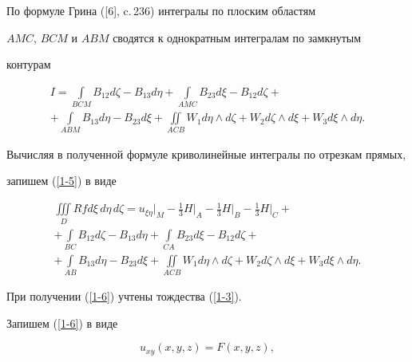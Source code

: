 По формуле Грина ([6], c.\,236) интегралы по плоским областям


$AMC$, $BCM$ и $ABM$ сводятся к однократным интегралам по замкнутым


контурам


\begin{gather*}


I=\int\limits_{BCM} B_{12} d\zeta - B_{13} d\eta


+\int\limits_{AMC} B_{23} d\xi - B_{12} d\zeta +\\


%


+\int\limits_{ABM} B_{13} d\eta - B_{23} d\xi


+\iint\limits_{ACB}  W_1 d\eta\wedge d\zeta


+W_2 d\zeta \wedge d\xi + W_3 d\xi \wedge d\eta.


\end{gather*}


Вычисляя в полученной формуле криволинейные интегралы по отрезкам прямых,


запишем (\ref{1-5}) в виде


\begin{multline}\label{1-6}   %


\iiint\limits_{D} Rf d\xi\, d\eta\, d\zeta=


u_{\xi\eta}\big\vert_{M}-\frac{1}{3}H\big\vert_{A}


-\frac{1}{3}H\big\vert_{B}


-\frac{1}{3}H\big\vert_{C}+\\


+\int\limits_{BC} B_{12} d\zeta - B_{13} d\eta


+\int\limits_{CA} B_{23} d\xi - B_{12} d\zeta +\\


+\int\limits_{AB} B_{13} d\eta - B_{23} d\xi


+\iint\limits_{ACB}  W_1 d\eta\wedge d\zeta


+W_2 d\zeta \wedge d\xi + W_3 d\xi \wedge d\eta.


\end{multline}


При получении (\ref{1-6}) учтены тождества (\ref{1-3}).





Запишем (\ref{1-6}) в виде


\begin{equation}\label{1-7}


u_{xy}(x,y,z)=F(x,y,z),


\end{equation}


